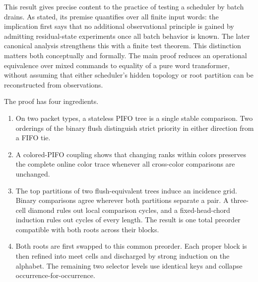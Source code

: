 This result gives precise content to the practice of testing a scheduler by
batch drains.  As stated, its premise quantifies over all finite input words:
the implication first says that no additional observational principle is
gained by admitting residual-state experiments once all batch behavior is
known.  The later canonical analysis strengthens this with a finite test
theorem.  This distinction matters both conceptually and formally.  The main
proof reduces an operational equivalence over mixed commands to equality of a
pure word transformer, without assuming that either scheduler's hidden
topology or root partition can be reconstructed from observations.

The proof has four ingredients.

\begin{enumerate}
\item On two packet types, a stateless PIFO tree is a single stable comparison.
      Two orderings of the binary flush distinguish strict priority in either
      direction from a FIFO tie.
\item A colored-PIFO coupling shows that changing ranks within colors preserves
      the complete online color trace whenever all cross-color comparisons are
      unchanged.
\item The top partitions of two flush-equivalent trees induce an incidence
      grid.  Binary comparisons agree wherever both partitions separate a
      pair.  A three-cell diamond rules out local comparison cycles, and a
      fixed-head-chord induction rules out cycles of every length.  The result
      is one total preorder compatible with both roots across their blocks.
\item Both roots are first swapped to this common preorder.  Each proper block
      is then refined into meet cells and discharged by strong induction on the
      alphabet.  The remaining two selector levels use identical keys and
      collapse occurrence-for-occurrence.
\end{enumerate}

